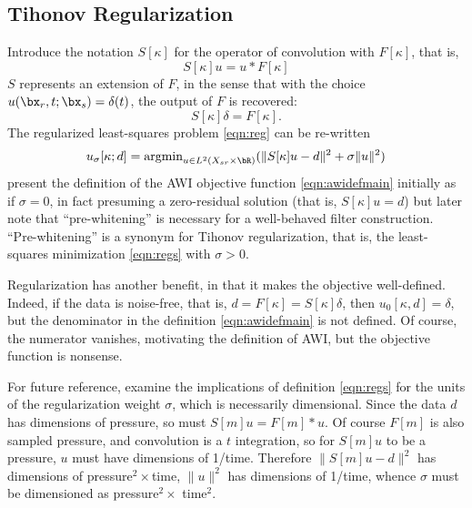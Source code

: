 \subsection{Tihonov Regularization}
Introduce the notation $S[\kappa]$ for the operator of convolution
with $F[\kappa]$, that is,
\begin{equation}
  \label{eqn:sdef}
  S[\kappa]u = u*F[\kappa]
\end{equation}
$S$ represents an
extension of $F$, in the sense that with the choice
$u(\bx_r,t;\bx_s)=\delta(t)$, the output of $F$ is recovered:
\begin{equation}
  \label{eqn:sconsist}
  S[\kappa]\delta = F[\kappa].
\end{equation}
The regularized least-squares problem \ref{eqn:reg} can be re-written
\begin{equation}
  \label{eqn:regs}
    u_{\sigma}[\kappa;d] = \mbox{argmin}_{u \in L^2(X_{sr} \times \bR)} (\|S[\kappa]u-d\|^2 + \sigma\|u\|^2)
  \end{equation}
\cite{Warner:16} present the definition of the AWI objective function
\ref{eqn:awidefmain} initially as if $\sigma=0$, in fact presuming a
zero-residual solution (that is, $S[\kappa]u=d$) but later note that
``pre-whitening'' is necessary for a well-behaved filter construction.
``Pre-whitening'' is a synonym for Tihonov regularization, that is,
the least-squares minimization \ref{eqn:regs} with $\sigma>0$.

Regularization has another benefit, in that it makes the objective
well-defined. Indeed, if the data is noise-free, that is,
$d=F[\kappa]=S[\kappa]\delta$, then $u_0[\kappa,d]=\delta$, but the
denominator in the definition \ref{eqn:awidefmain} is not defined.
Of course, the numerator vanishes, motivating the definition of AWI,
but the objective function is nonsense.

For future reference, examine the implications of definition
\ref{eqn:regs} for the units of the regularization weight $\sigma$,
which is necessarily dimensional. Since the data $d$ has dimensions of
pressure, so must $S[m]u = F[m]*u$. Of course $F[m]$ is also sampled
pressure, and convolution is a $t$ integration, so for $S[m]u$ to be a
pressure, $u$ must have dimensions of 1/time. Therefore
$\|S[m]u-d\|^2$ has dimensions of pressure$^2 \times $time, $\|u\|^2$
has dimensions of 1/time, whence $\sigma$ must be dimensioned as
pressure$^2 \times$ time$^2$.

